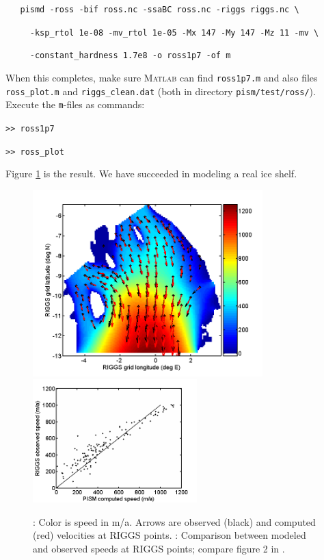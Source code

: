 \documentclass[11pt,final]{amsart}
\newcommand{\Matlab}{\textsc{Matlab}\xspace}
\begin{document}
\verb|   pismd -ross -bif ross.nc -ssaBC ross.nc -riggs riggs.nc \|

\verb|     -ksp_rtol 1e-08 -mv_rtol 1e-05 -Mx 147 -My 147 -Mz 11 -mv \|

\verb|     -constant_hardness 1.7e8 -o ross1p7 -of m|

\noindent When this completes, make sure \Matlab can find \verb|ross1p7.m| and also files \verb|ross_plot.m| and \verb|riggs_clean.dat| (both in directory \verb|pism/test/ross/|).  Execute the \verb|m|-files as commands:

\verb|>> ross1p7|

\verb|>> ross_plot|

\noindent Figure \ref{fig:rossmatlab} is the result.  We have succeeded in modeling a real ice shelf.

\begin{figure}[ht]
\includegraphics[width=3.5in,keepaspectratio=true]{figs/rossquiver}\quad \includegraphics[width=2.5in,keepaspectratio=true]{figs/rossscatter}
\caption{: Color is speed in m/a.  Arrows are observed (black) and computed (red) velocities at RIGGS points.  : Comparison between modeled and observed speeds at RIGGS points; compare figure 2  in \cite{MacAyealetal}.}
\label{fig:rossmatlab}
\end{figure}
\end{document}
